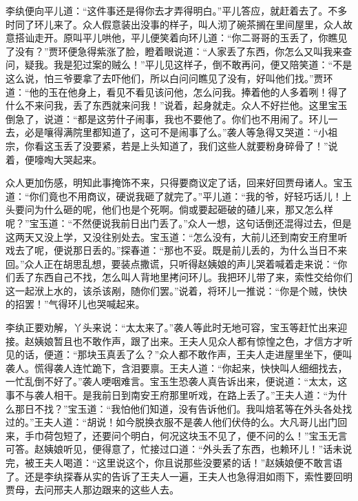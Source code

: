 \begin{parag}
    李纨便向平儿道：“这件事还是得你去才弄得明白。”平儿答应，就赶着去了。不多时同了环儿来了。众人假意装出没事的样子，叫人沏了碗茶搁在里间屋里，众人故意搭讪走开。原叫平儿哄他，平儿便笑着向环儿道：“你二哥哥的玉丢了，你瞧见了没有？”贾环便急得紫涨了脸，瞪着眼说道：“人家丢了东西，你怎么又叫我来查问，疑我。我是犯过案的贼么！”平儿见这样子，倒不敢再问，便又陪笑道：“不是这么说，怕三爷要拿了去吓他们，所以白问问瞧见了没有，好叫他们找。”贾环道：“他的玉在他身上，看见不看见该问他，怎么问我。捧着他的人多着咧！得了什么不来问我，丢了东西就来问我！”说着，起身就走。众人不好拦他。这里宝玉倒急了，说道：“都是这劳什子闹事，我也不要他了。你们也不用闹了。环儿一去，必是嚷得满院里都知道了，这可不是闹事了么。”袭人等急得又哭道：“小祖宗，你看这玉丢了没要紧，若是上头知道了，我们这些人就要粉身碎骨了！”说着，便嚎啕大哭起来。
\end{parag}


\begin{parag}
    众人更加伤感，明知此事掩饰不来，只得要商议定了话，回来好回贾母诸人。宝玉道：“你们竟也不用商议，硬说我砸了就完了。”平儿道：“我的爷，好轻巧话儿！上头要问为什么砸的呢，他们也是个死啊。倘或要起砸破的碴儿来，那又怎么样呢？”宝玉道：“不然便说我前日出门丢了。”众人一想，这句话倒还混得过去，但是这两天又没上学，又没往别处去。宝玉道：“怎么没有，大前儿还到南安王府里听戏去了呢，便说那日丢的。”探春道：“那也不妥。既是前儿丢的，为什么当日不来回。”众人正在胡思乱想，要装点撒谎，只听得赵姨娘的声儿哭着喊着走来说：“你们丢了东西自己不找，怎么叫人背地里拷问环儿。我把环儿带了来，索性交给你们这一起洑上水的，该杀该剐，随你们罢。”说着，将环儿一推说：“你是个贼，快快的招罢！”气得环儿也哭喊起来。
\end{parag}


\begin{parag}
    李纨正要劝解，丫头来说：“太太来了。”袭人等此时无地可容，宝玉等赶忙出来迎接。赵姨娘暂且也不敢作声，跟了出来。王夫人见众人都有惊惶之色，才信方才听见的话，便道：“那块玉真丢了么？”众人都不敢作声，王夫人走进屋里坐下，便叫袭人。慌得袭人连忙跪下，含泪要禀。王夫人道：“你起来，快快叫人细细找去，一忙乱倒不好了。”袭人哽咽难言。宝玉生恐袭人真告诉出来，便说道：“太太，这事不与袭人相干。是我前日到南安王府那里听戏，在路上丢了。”王夫人道：“为什么那日不找？”宝玉道：“我怕他们知道，没有告诉他们。我叫焙茗等在外头各处找过的。”王夫人道：“胡说！如今脱换衣服不是袭人他们伏侍的么。大凡哥儿出门回来，手巾荷包短了，还要问个明白，何况这块玉不见了，便不问的么！”宝玉无言可答。赵姨娘听见，便得意了，忙接过口道：“外头丢了东西，也赖环儿！”话未说完，被王夫人喝道：“这里说这个，你且说那些没要紧的话！”赵姨娘便不敢言语了。还是李纨探春从实的告诉了王夫人一遍，王夫人也急得泪如雨下，索性要回明贾母，去问邢夫人那边跟来的这些人去。
\end{parag}


